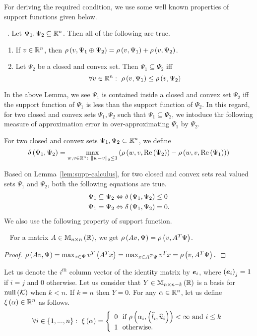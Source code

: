 For deriving the required condition, we use some well known properties
of support functions given below.
%
\begin{lemma}~\label{lem:supp-calculus}.  Let $\Psi_1,\Psi_2\subseteq\mathbb{R}^n$.  Then all of the following are true.
%
\begin{enumerate}
\item If $v\in\mathbb{R}^n$, then $\rho\left(v,\Psi_1\oplus\Psi_2\right)=\rho\left(v,\Psi_1\right)+\rho\left(v,\Psi_2\right)$.
\item Let $\Psi_2$ be a closed and convex set.  Then
$\Psi_1\subseteq\Psi_2$ iff
%
\[
\forall v\in\mathbb{R}^n:~\rho\left(v,\Psi_1\right)\leq\rho\left(v,\Psi_2\right)
\]
%
\end{enumerate}
%
\end{lemma}
%
In the above Lemma, we see $\Psi_1$ is contained inside a closed and
convex set $\Psi_2$ iff the support function of $\Psi_1$ is less than
the support function of $\Psi_2$.  In this regard, for two closed and
convex sets $\Psi_1,\Psi_2$ such that $\Psi_1\subseteq\Psi_2$, we
intoduce thr following measure of approximation error in
over-approximating $\Psi_1$ by $\Psi_2$.
%
\begin{definition}
For two closed and convex sets $\Psi_1,\Psi_2\subset\mathbb{R}^n$, we
define
\[
\delta\left(\Psi_1,\Psi_2\right)=\max_{w,v\in\mathbb{R}^n:~\left\|w-v\right\|_2\leq
  1}\left(\rho\left(w,v,\operatorname{Re}\left(\Psi_2\right)\right)-\rho\left(w,v,\operatorname{Re}\left(\Psi_1\right)\right)\right)
\]
%
\end{definition}
%
Based on Lemma~\ref{lem:supp-calculus}, for two closed and convex sets
real valued sets
$\Psi_1$ and $\Psi_2$, both the following equations are true.
%
\begin{align*}
& \Psi_1\subseteq\Psi_2 \Leftrightarrow \delta\left(\Psi_1,\Psi_2\right)\leq 0\\
& \Psi_1=\Psi_2 \Leftrightarrow \delta\left(\Psi_1,\Psi_2\right)=0.
\end{align*}
%
We also use the following property of support function.
%
\begin{lemma}~\label{lem:supp-mult-matrix}
For a matrix $A\in\mathbb{M}_{n\times n}\left(\mathbb{R}\right)$, we get $\rho\left(Av,\Psi\right)=\rho\left(v,A^T\Psi\right)$.
\end{lemma}
%
\begin{proof}
$\rho\left(Av,\Psi\right)=\max_{x\in\Psi}v^T\left(A^Tx\right)=\max_{x\in
A^T\Psi}v^Tx=\rho\left(v,A^T\Psi\right).$
\end{proof}
%
Let us denote the $i^{th}$ column vector of the identity matrix by
$\bm{e}_{i}$, where $\left(\bm{e}_{i}\right)_j=1$ if $i=j$ and $0$ otherwise.
Let us consider that $Y\in\mathbb{M}_{n\times n-k}\left(\mathbb{R}\right)$ is a basis for
$\operatorname{null}\left(\mathcal{K}\right)$ when $k<n$.  If $k=n$ then $Y=0$.  For any
$\alpha\in\mathbb{R}^n$, let us define $\xi\left(\alpha\right)\in\mathbb{R}^n$ as
follows. 
%
\[
\forall i\in\left\{1,...,n\right\}:~\xi\left(\alpha\right)=
\left\{\begin{array}{l}
0~~\text{if}~\rho\left(\alpha_i,\left(\widehat{l}_i,\widehat{u}_i\right)\right)<\infty~\text{and}~i\leq k\\
1~~\text{otherwise}.
\end{array}
\right.
\]
%

